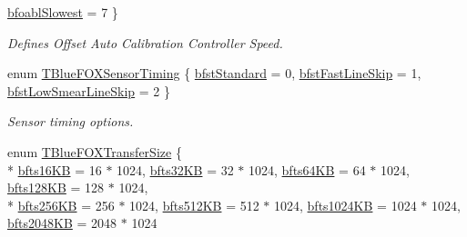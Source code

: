 \begin{DoxyCompactItemize}
\hyperlink{group___device_specific_interface_gga6858da05a066281204fc6a18c037da1ca454f671f8d608cb195c0108680d0f31a}{bfoabl\+Slowest} = 7
 \}
\begin{DoxyCompactList}\small\item\em Defines Offset Auto Calibration Controller Speed. \end{DoxyCompactList}\item 
enum \hyperlink{group___device_specific_interface_gadd4b25a331e78a5cbe1478ba1e96fa4d}{T\+Blue\+F\+O\+X\+Sensor\+Timing} \{ \hyperlink{group___device_specific_interface_ggadd4b25a331e78a5cbe1478ba1e96fa4da3028026a34d8526eb675778cc4493b5b}{bfst\+Standard} = 0, 
\hyperlink{group___device_specific_interface_ggadd4b25a331e78a5cbe1478ba1e96fa4da04978251127075d8169ebf8dfea5ceed}{bfst\+Fast\+Line\+Skip} = 1, 
\hyperlink{group___device_specific_interface_ggadd4b25a331e78a5cbe1478ba1e96fa4da71d9b9d2142426bacebfc67211728920}{bfst\+Low\+Smear\+Line\+Skip} = 2
 \}
\begin{DoxyCompactList}\small\item\em Sensor timing options. \end{DoxyCompactList}\item 
enum \hyperlink{group___device_specific_interface_ga3d85571ec2d787bc90e363a8955eca11}{T\+Blue\+F\+O\+X\+Transfer\+Size} \{ \\*
\hyperlink{group___device_specific_interface_gga3d85571ec2d787bc90e363a8955eca11a71e0bf02cbcebf1ceb6eac783be190b2}{bfts16\+K\+B} = 16 $\ast$ 1024, 
\hyperlink{group___device_specific_interface_gga3d85571ec2d787bc90e363a8955eca11ad382d2e3c57e1da075cc33d7ee0111cc}{bfts32\+K\+B} = 32 $\ast$ 1024, 
\hyperlink{group___device_specific_interface_gga3d85571ec2d787bc90e363a8955eca11a47b1bb39359f5ddb175d6bb64bf71081}{bfts64\+K\+B} = 64 $\ast$ 1024, 
\hyperlink{group___device_specific_interface_gga3d85571ec2d787bc90e363a8955eca11a31ab79e08ebb5cc8df3e28f767c55af3}{bfts128\+K\+B} = 128 $\ast$ 1024, 
\\*
\hyperlink{group___device_specific_interface_gga3d85571ec2d787bc90e363a8955eca11ae976b8cefbdcb56b4aeb9708c6ca6701}{bfts256\+K\+B} = 256 $\ast$ 1024, 
\hyperlink{group___device_specific_interface_gga3d85571ec2d787bc90e363a8955eca11a93215f41b8b67e16b2968249f05052b6}{bfts512\+K\+B} = 512 $\ast$ 1024, 
\hyperlink{group___device_specific_interface_gga3d85571ec2d787bc90e363a8955eca11a2e6067e4c63d9b35b055553453a00969}{bfts1024\+K\+B} = 1024 $\ast$ 1024, 
\hyperlink{group___device_specific_interface_gga3d85571ec2d787bc90e363a8955eca11ae7548ee9abde81688c1788d3c55fbffd}{bfts2048\+K\+B} = 2048 $\ast$ 1024

\end{DoxyCompactItemize}
